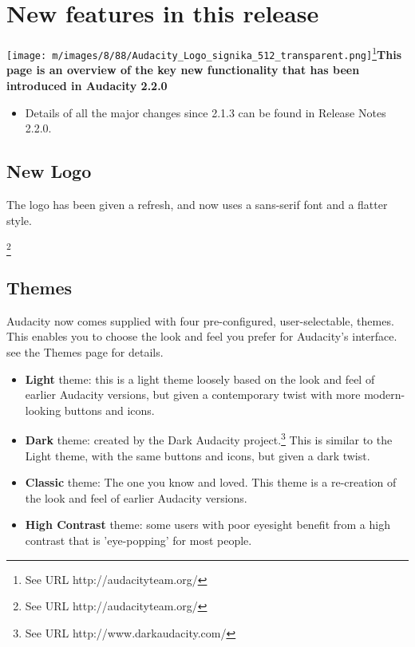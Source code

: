 
																					
\chapter{New features in this release}
					
{\centering \texttt{[image: m/images/8/88/Audacity\_Logo\_signika\_512\_transparent.png]}\footnote{See URL http://audacityteam.org/}}\textbf{This page is an overview of the key new functionality that has been introduced in Audacity 2.2.0}
\begin{itemize}
\item  Details of all the major changes since 2.1.3 can be found in Release Notes 2.2.0.
\end{itemize}

\section{New Logo}


The logo has been given a refresh, and now uses a sans-serif font and a flatter style.

\footnote{See URL http://audacityteam.org/}
\section{Themes}


Audacity now comes supplied with four pre-configured, user-selectable, themes.  This enables you to choose the look and feel you prefer for Audacity's interface. see the Themes page for details.
\begin{itemize}
\item \textbf{Light} theme: this is a light theme loosely based on the look and feel of earlier Audacity versions, but given a contemporary twist with more modern-looking buttons and icons. 
\item \textbf{Dark} theme: created by the Dark Audacity project.\footnote{See URL http://www.darkaudacity.com/} This is similar to the Light theme, with the same buttons and icons, but given a dark twist.
\item \textbf{Classic} theme: The one you know and loved. This theme is a re-creation of the look and feel of earlier Audacity versions. 
\item \textbf{High Contrast} theme: some users with poor eyesight benefit from a high contrast that is 'eye-popping' for most people.
\end{itemize}


